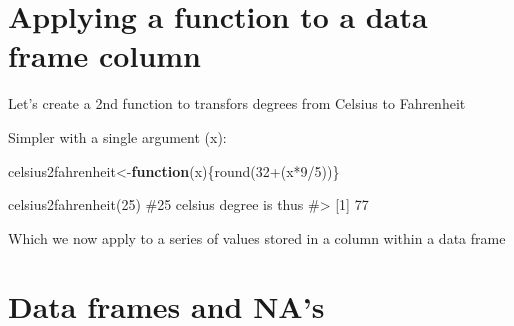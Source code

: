 \documentclass[
  letterpaper,
  DIV=11,
  numbers=noendperiod]{scrreprt}
\newenvironment{Shaded}{\begin{snugshade}}{\end{snugshade}}
\newcommand{\AttributeTok}[1]{\textcolor[rgb]{0.40,0.45,0.13}{#1}}
\newcommand{\CommentTok}[1]{\textcolor[rgb]{0.37,0.37,0.37}{#1}}
\newcommand{\ControlFlowTok}[1]{\textcolor[rgb]{0.00,0.23,0.31}{\textbf{#1}}}
\newcommand{\DecValTok}[1]{\textcolor[rgb]{0.68,0.00,0.00}{#1}}
\newcommand{\FunctionTok}[1]{\textcolor[rgb]{0.28,0.35,0.67}{#1}}
\newcommand{\NormalTok}[1]{\textcolor[rgb]{0.00,0.23,0.31}{#1}}
\newcommand{\OtherTok}[1]{\textcolor[rgb]{0.00,0.23,0.31}{#1}}
\newcommand{\SpecialCharTok}[1]{\textcolor[rgb]{0.37,0.37,0.37}{#1}}
\newcommand{\StringTok}[1]{\textcolor[rgb]{0.13,0.47,0.30}{#1}}
\begin{document}
\section{Applying a function to a data frame
column}\label{applying-a-function-to-a-data-frame-column}

Let's create a 2nd function to transfors degrees from Celsius to
Fahrenheit

Simpler with a single argument (x):

\begin{Shaded}
\begin{Highlighting}[]
\NormalTok{celsius2fahrenheit}\OtherTok{\textless{}{-}}\ControlFlowTok{function}\NormalTok{(x)\{}\FunctionTok{round}\NormalTok{(}\DecValTok{32}\SpecialCharTok{+}\NormalTok{(x}\SpecialCharTok{*}\DecValTok{9}\SpecialCharTok{/}\DecValTok{5}\NormalTok{))\}}

\FunctionTok{celsius2fahrenheit}\NormalTok{(}\DecValTok{25}\NormalTok{) }\CommentTok{\#25 celsius degree is thus }
\CommentTok{\#\textgreater{} [1] 77}
\end{Highlighting}
\end{Shaded}

Which we now apply to a series of values stored in a column within a
data frame

\begin{Shaded}
\end{Shaded}

\section{Data frames and NA's}\label{data-frames-and-nas}
\end{document}
